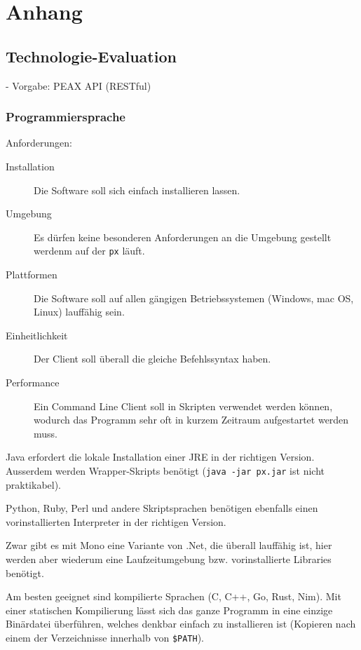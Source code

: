 \section{Anhang}

\subsection{Technologie-Evaluation}

- Vorgabe: PEAX API (RESTful)

\subsubsection{Programmiersprache}

Anforderungen:

\begin{description}
    \item[Installation] Die Software soll sich einfach installieren lassen.
    \item[Umgebung] Es dürfen keine besonderen Anforderungen an die Umgebung gestellt werdenm auf der \texttt{px} läuft.
    \item[Plattformen] Die Software soll auf allen gängigen Betriebssystemen (Windows, mac OS, Linux) lauffähig sein.
    \item[Einheitlichkeit] Der Client soll überall die gleiche Befehlssyntax haben.
    \item[Performance] Ein Command Line Client soll in Skripten verwendet werden können, wodurch das Programm sehr oft in kurzem Zeitraum aufgestartet werden muss.
\end{description}

Java erfordert die lokale Installation einer JRE in der richtigen Version. Ausserdem werden Wrapper-Skripts benötigt (\texttt{java -jar px.jar} ist nicht praktikabel).

Python, Ruby, Perl und andere Skriptsprachen benötigen ebenfalls einen vorinstallierten Interpreter in der richtigen Version.

Zwar gibt es mit Mono eine Variante von .Net, die überall lauffähig ist, hier werden aber wiederum eine Laufzeitumgebung bzw. vorinstallierte Libraries benötigt.

Am besten geeignet sind kompilierte Sprachen (C, C++, Go, Rust, Nim). Mit einer statischen Kompilierung lässt sich das ganze Programm in eine einzige Binärdatei überführen, welches denkbar einfach zu installieren ist (Kopieren nach einem der Verzeichnisse innerhalb von \texttt{\$PATH}).

